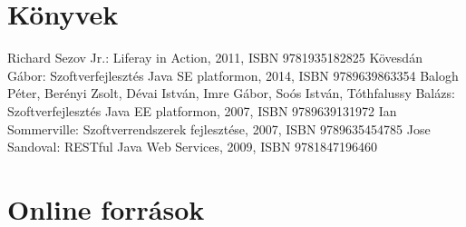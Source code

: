 \documentclass[hidelinks, 12pt, a4paper]{report}
\begin{document}
\clearpage
{}
\begin{thebibliography}{10}

\section*{Könyvek}

 Richard Sezov Jr.: Liferay in Action, 2011, ISBN 9781935182825
 Kövesdán Gábor: Szoftverfejlesztés Java SE platformon, 2014, ISBN 9789639863354
 Balogh Péter, Berényi Zsolt, Dévai István, Imre Gábor, Soós István, Tóthfalussy Balázs: Szoftverfejlesztés Java EE platformon, 2007, ISBN 9789639131972
 Ian Sommerville: Szoftverrendszerek fejlesztése, 2007, ISBN 9789635454785
 Jose Sandoval: RESTful Java Web Services, 2009, ISBN 9781847196460

\section*{Online források}


\end{thebibliography}
\end{document}
